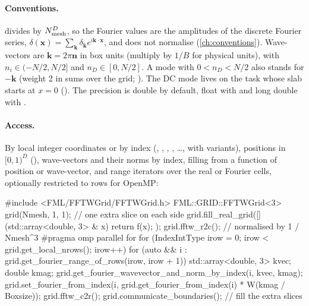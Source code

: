 \paragraph*{Conventions.}  divides by $N_{\rm mesh}^D$, so the Fourier values are the amplitudes of the
discrete Fourier series, $\delta(\bm x)=\sum_{\bm k}\delta_{\bm k}e^{i\bm k\cdot\bm x}$, and  does not
normalise (\cref{ch:conventions}). Wave-vectors are $\bm k=2\pi\bm n$ in box units (multiply by $1/B$ for physical units),
with $n_i\in(-N/2,N/2]$ and $n_D\in[0,N/2]$. A mode with $0<n_D<N/2$ also stands for $-\bm k$ (weight 2 in sums over the
grid; ). The DC mode lives on the task whose slab starts at $x=0$ ().
The precision is double by default, float with  and long double with
.

\paragraph*{Access.} By local integer coordinates or by index (, , ,
, \ldots, with  variants), positions in $[0,1)^D$ (),
wave-vectors and their norms by index, filling from a function of position or wave-vector, and range iterators over the real
or Fourier cells, optionally restricted to rows for OpenMP:

\begin{cppcode}
#include <FML/FFTWGrid/FFTWGrid.h>
FML::GRID::FFTWGrid<3> grid(Nmesh, 1, 1);            // one extra slice on each side
grid.fill_real_grid([](std::array<double, 3> & x) { return f(x); });
grid.fftw_r2c();                                     // normalised by 1 / Nmesh^3
#pragma omp parallel for
for (IndexIntType irow = 0; irow < grid.get_local_nrows(); irow++)
    for (auto && i : grid.get_fourier_range_of_rows(irow, irow + 1)) {
        std::array<double, 3> kvec;  double kmag;
        grid.get_fourier_wavevector_and_norm_by_index(i, kvec, kmag);
        grid.set_fourier_from_index(i, grid.get_fourier_from_index(i) * W(kmag / Boxsize));
    }
grid.fftw_c2r();
grid.communicate_boundaries();                       // fill the extra slices
\end{cppcode}

